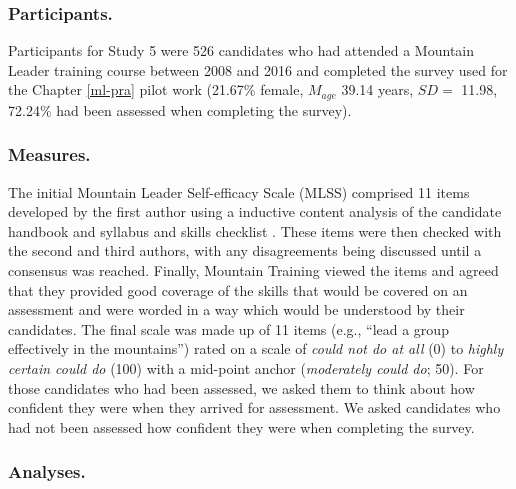 \documentclass[
  12pt,
  a4paper,
]{book}
\begin{document}
\hypertarget{study-5-participants}{%
\subsubsection{Participants.}\label{study-5-participants}}

Participants for Study 5 were 526 candidates who had attended a Mountain Leader training course between 2008 and 2016 and completed the survey used for the Chapter \ref{ml-pra} pilot work (21.67\% female, \(M_{age}\) 39.14 years, \(SD =\) 11.98, 72.24\% had been assessed when completing the survey).

\hypertarget{study-5-measures}{%
\subsubsection{Measures.}\label{study-5-measures}}

The initial Mountain Leader Self-efficacy Scale (MLSS) comprised 11 items developed by the first author using a inductive content analysis \citep{Cho2014} of the candidate handbook and syllabus \citep{MTUK2015a} and skills checklist \citep{MTUK2015a}. These items were then checked with the second and third authors, with any disagreements being discussed until a consensus was reached. Finally, Mountain Training viewed the items and agreed that they provided good coverage of the skills that would be covered on an assessment and were worded in a way which would be understood by their candidates. The final scale was made up of 11 items (e.g., ``lead a group effectively in the mountains'') rated on a scale of \emph{could not do at all} (0) to \emph{highly certain could do} (100) with a mid-point anchor (\emph{moderately could do}; 50). For those candidates who had been assessed, we asked them to think about how confident they were when they arrived for assessment. We asked candidates who had not been assessed how confident they were when completing the survey.

\hypertarget{study-5-analyses}{%
\subsubsection{Analyses.}\label{study-5-analyses}}
\end{document}

